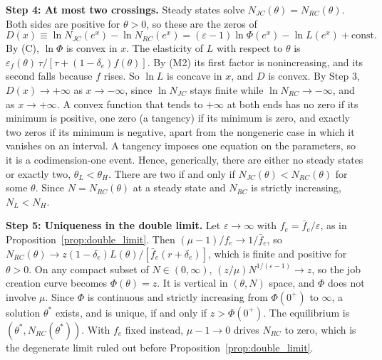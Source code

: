 \documentclass[authoryear, review, 12pt]{elsarticle}
\begin{document}
\medskip\noindent\textbf{Step 4: At most two crossings.}
Steady states solve $N_{JC}(\theta)=N_{RC}(\theta)$. Both sides are positive for $\theta>0$,
so these are the zeros of
\[
  D(x)\equiv\ln N_{JC}(e^x)-\ln N_{RC}(e^x)
  =(\varepsilon-1)\ln\Phi(e^x)-\ln L(e^x)+\text{const}.
\]
By (C), $\ln\Phi$ is convex in $x$. The elasticity of $L$ with respect to $\theta$ is
$\varepsilon_f(\theta)\,\tau/[\tau+(1-\delta_e)f(\theta)]$. By (M2) its first factor is
nonincreasing, and its second falls because $f$ rises. So $\ln L$ is concave in $x$, and
$D$ is convex. By Step 3, $D(x)\to+\infty$ as $x\to-\infty$, since $\ln N_{JC}$ stays
finite while $\ln N_{RC}\to-\infty$, and as $x\to+\infty$. A convex function that tends
to $+\infty$ at both ends has no zero if its minimum is positive, one zero (a tangency) if
its minimum is zero, and exactly two zeros if its minimum is negative, apart from the
nongeneric case in which it vanishes on an interval. A tangency imposes one equation on the
parameters, so it is a codimension-one event. Hence, generically, there are either no
steady states or exactly two, $\theta_L<\theta_H$. There are two if and only if
$N_{JC}(\theta)<N_{RC}(\theta)$ for some $\theta$. Since $N=N_{RC}(\theta)$ at a steady state
and $N_{RC}$ is strictly increasing, $N_L<N_H$.

\medskip\noindent\textbf{Step 5: Uniqueness in the double limit.}
Let $\varepsilon\to\infty$ with $f_e=\bar{f}_e/\varepsilon$, as in
Proposition~\ref{prop:double_limit}. Then $(\mu-1)/f_e\to1/\bar{f}_e$, so
$N_{RC}(\theta)\to z(1-\delta_e)L(\theta)/[\bar{f}_e(r+\delta_e)]$, which is finite and
positive for $\theta>0$. On any compact subset of $N\in(0,\infty)$,
$(z/\mu)N^{1/(\varepsilon-1)}\to z$, so the job creation curve becomes $\Phi(\theta)=z$.
It is vertical in $(\theta,N)$ space, and $\Phi$ does not involve $\mu$. Since $\Phi$ is
continuous and strictly increasing from $\Phi(0^+)$ to $\infty$, a solution $\theta^*$
exists, and is unique, if and only if $z>\Phi(0^+)$. The equilibrium is
$(\theta^*,N_{RC}(\theta^*))$. With $f_e$ fixed instead, $\mu-1\to0$ drives $N_{RC}$ to
zero, which is the degenerate limit ruled out before Proposition~\ref{prop:double_limit}.
\end{document}
